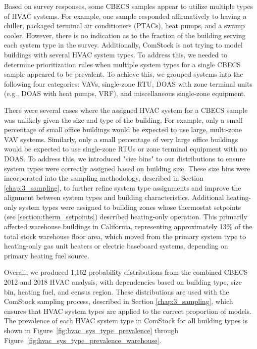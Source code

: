Based on survey responses, some CBECS samples appear to utilize multiple types of HVAC systems. For example, one sample responded affirmatively to having a chiller, packaged terminal air conditioners (PTACs), heat pumps, and a swamp cooler. However, there is no indication as to the fraction of the building serving each system type in the survey. Additionally, ComStock is not trying to model buildings with several HVAC system types. To address this, we needed to determine prioritization rules when multiple system types for a single CBECS sample appeared to be prevalent. To achieve this, we grouped systems into the following four categories: VAVs, single-zone RTU, DOAS with zone terminal units (e.g., DOAS with heat pumps, VRF), and miscellaneous single-zone equipment.

There were several cases where the assigned HVAC system for a CBECS sample was unlikely given the size and type of the building. For example, only a small percentage of small office buildings would be expected to use large, multi-zone VAV systems. Similarly, only a small percentage of very large office buildings would be expected to use single-zone RTUs or zone terminal equipment with no DOAS. To address this, we introduced "size bins" to our distributions to ensure system types were correctly assigned based on building size. These size bins were incorporated into the sampling methodology, described in Section \ref{chap:3_sampling}, to further refine system type assignments and improve the alignment between system types and building characteristics. Additional heating-only system types were assigned to building zones whose thermostat setpoints (see \ref{section:therm_setpoints}) described heating-only operation. This primarily affected warehouse buildings in California, representing approximately 13\% of the total stock warehouse floor area, which moved from the primary system type to heating-only gas unit heaters or electric baseboard systems, depending on primary heating fuel source.

Overall, we produced 1,162 probability distributions from the combined CBECS 2012 and 2018 HVAC analysis, with dependencies based on building type, size bin, heating fuel, and census region. These distributions are used with the ComStock sampling process, described in Section \ref{chap:3_sampling}, which ensures that HVAC system types are applied to the correct proportion of models. The prevalence of each HVAC system type in ComStock for all building types is shown in Figure~\ref{fig:hvac_sys_type_prevalence} through Figure~\ref{fig:hvac_sys_type_prevalence_warehouse}.

